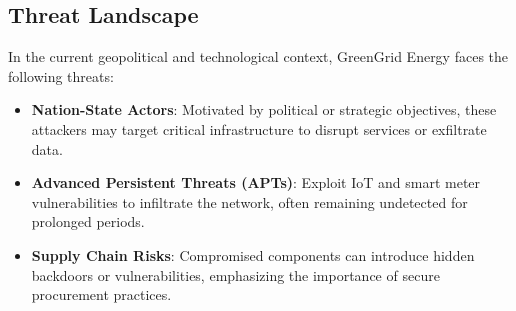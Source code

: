 \subsection{Threat Landscape}
In the current geopolitical and technological context, GreenGrid Energy faces the following threats:
\begin{itemize}
    \item \textbf{Nation-State Actors}: Motivated by political or strategic objectives, these attackers may target critical infrastructure to disrupt services or exfiltrate data.
    \item \textbf{Advanced Persistent Threats (APTs)}: Exploit IoT and smart meter vulnerabilities to infiltrate the network, often remaining undetected for prolonged periods.
    \item \textbf{Supply Chain Risks}: Compromised components can introduce hidden backdoors or vulnerabilities, emphasizing the importance of secure procurement practices.
\end{itemize}